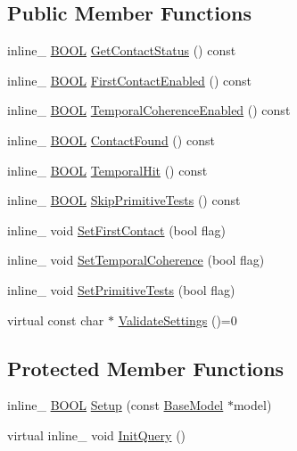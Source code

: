 \subsection*{Public Member Functions}
\begin{DoxyCompactItemize}
\item 
inline\+\_\+ \hyperlink{IceTypes_8h_a050c65e107f0c828f856a231f4b4e788}{B\+O\+OL} \hyperlink{classCollider_a64a73882d4f167a6175658f014868f66}{Get\+Contact\+Status} () const 
\item 
inline\+\_\+ \hyperlink{IceTypes_8h_a050c65e107f0c828f856a231f4b4e788}{B\+O\+OL} \hyperlink{classCollider_af57d7a211c40826fa86e6623dfc387a0}{First\+Contact\+Enabled} () const 
\item 
inline\+\_\+ \hyperlink{IceTypes_8h_a050c65e107f0c828f856a231f4b4e788}{B\+O\+OL} \hyperlink{classCollider_a94d86f6bd160dfbd02bd83e227f22047}{Temporal\+Coherence\+Enabled} () const 
\item 
inline\+\_\+ \hyperlink{IceTypes_8h_a050c65e107f0c828f856a231f4b4e788}{B\+O\+OL} \hyperlink{classCollider_a447787bced889e4a5843177f74f7e019}{Contact\+Found} () const 
\item 
inline\+\_\+ \hyperlink{IceTypes_8h_a050c65e107f0c828f856a231f4b4e788}{B\+O\+OL} \hyperlink{classCollider_a987693a9088b196d17a3af31190ed040}{Temporal\+Hit} () const 
\item 
inline\+\_\+ \hyperlink{IceTypes_8h_a050c65e107f0c828f856a231f4b4e788}{B\+O\+OL} \hyperlink{classCollider_a206226280dfadc656a7ead72542a9025}{Skip\+Primitive\+Tests} () const 
\item 
inline\+\_\+ void \hyperlink{classCollider_a106bfa35e6d203dfdb27a291b9fab01a}{Set\+First\+Contact} (bool flag)
\item 
inline\+\_\+ void \hyperlink{classCollider_a66fdf6157bf0159578723f3ed66f6e3f}{Set\+Temporal\+Coherence} (bool flag)
\item 
inline\+\_\+ void \hyperlink{classCollider_ad1c058ee059dc67a363dcad107742c07}{Set\+Primitive\+Tests} (bool flag)
\item 
virtual const char $\ast$ \hyperlink{classCollider_a225d4861b2184336433894174c6e3e2d}{Validate\+Settings} ()=0
\end{DoxyCompactItemize}
\subsection*{Protected Member Functions}
\begin{DoxyCompactItemize}
\item 
inline\+\_\+ \hyperlink{IceTypes_8h_a050c65e107f0c828f856a231f4b4e788}{B\+O\+OL} \hyperlink{classCollider_a1ff2fb91de2e8a6d613ef97a8ed7f780}{Setup} (const \hyperlink{classBaseModel}{Base\+Model} $\ast$model)
\item 
virtual inline\+\_\+ void \hyperlink{classCollider_a4ad7ed0314483cf47898290f4ac69081}{Init\+Query} ()
\end{DoxyCompactItemize}
